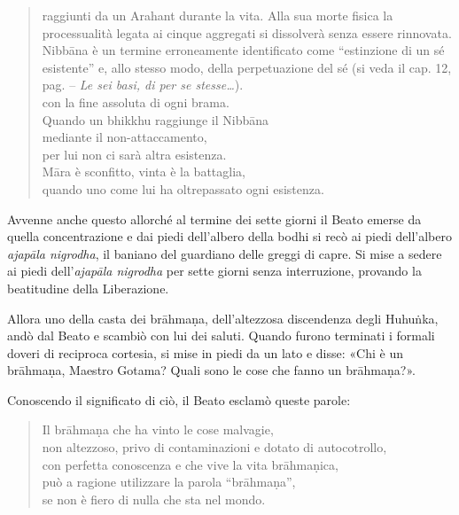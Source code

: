 \begin{quote}
{    raggiunti da un Arahant durante la vita. Alla sua morte fisica la
    processualità legata ai cinque aggregati si dissolverà senza essere
    rinnovata. Nibbāna è un termine erroneamente identificato come “estinzione
    di un sé esistente” e, allo stesso
    modo, della perpetuazione del sé (si veda il cap. 12, pag. \pageref{pag254} -- \emph{Le sei basi, di per se stesse\ldots}).} \\
  con la fine assoluta di ogni brama. \\
  Quando un bhikkhu raggiunge il Nibbāna \\
  mediante il non-attaccamento, \\
  per lui non ci sarà altra esistenza. \\
  Māra è sconfitto, vinta è la battaglia, \\
  quando uno come lui ha oltrepassato ogni esistenza.

\end{quote}


 Avvenne anche questo allorché al termine dei sette giorni
il Beato emerse da quella concentrazione e dai piedi dell’albero della bodhi si
recò ai piedi dell’albero \emph{ajapāla nigrodha}, il baniano del guardiano
delle greggi di capre. Si mise a sedere ai piedi dell’\emph{ajapāla nigrodha}
per sette giorni senza interruzione, provando la beatitudine della Liberazione.

Allora uno della casta dei brāhmaṇa, dell’altezzosa discendenza degli Huhuṅka,
andò dal Beato e scambiò con lui dei saluti. Quando furono terminati i formali
doveri di reciproca cortesia, si mise in piedi da un lato e disse: «Chi è un
brāhmaṇa, Maestro Gotama? Quali sono le cose che fanno un brāhmaṇa?».

Conoscendo il significato di ciò, il Beato esclamò queste parole:

\begin{quote}
Il brāhmaṇa che ha vinto le cose malvagie, \\
non altezzoso, privo di contaminazioni e dotato di autocotrollo, \\
con perfetta conoscenza e che vive la vita brāhmaṇica, \\
può a ragione utilizzare la parola “brāhmaṇa”, \\
se non è fiero di nulla che sta nel mondo.
\end{quote}


